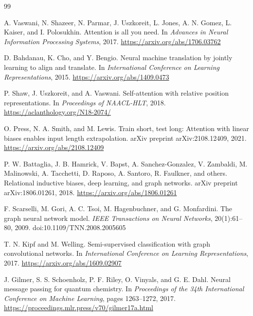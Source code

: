 \documentclass[11pt]{article}
\begin{document}
\begin{thebibliography}{99}

A. Vaswani, N. Shazeer, N. Parmar, J. Uszkoreit, L. Jones, A. N. Gomez, L. Kaiser, and I. Polosukhin.
\newblock Attention is all you need.
\newblock In \emph{Advances in Neural Information Processing Systems}, 2017.
\newblock \url{https://arxiv.org/abs/1706.03762}

D. Bahdanau, K. Cho, and Y. Bengio.
\newblock Neural machine translation by jointly learning to align and translate.
\newblock In \emph{International Conference on Learning Representations}, 2015.
\newblock \url{https://arxiv.org/abs/1409.0473}

P. Shaw, J. Uszkoreit, and A. Vaswani.
\newblock Self-attention with relative position representations.
\newblock In \emph{Proceedings of NAACL-HLT}, 2018.
\newblock \url{https://aclanthology.org/N18-2074/}

O. Press, N. A. Smith, and M. Lewis.
\newblock Train short, test long: Attention with linear biases enables input length extrapolation.
\newblock arXiv preprint arXiv:2108.12409, 2021.
\newblock \url{https://arxiv.org/abs/2108.12409}

P. W. Battaglia, J. B. Hamrick, V. Bapst, A. Sanchez-Gonzalez, V. Zambaldi, M. Malinowski, A. Tacchetti, D. Raposo, A. Santoro, R. Faulkner, and others.
\newblock Relational inductive biases, deep learning, and graph networks.
\newblock arXiv preprint arXiv:1806.01261, 2018.
\newblock \url{https://arxiv.org/abs/1806.01261}

F. Scarselli, M. Gori, A. C. Tsoi, M. Hagenbuchner, and G. Monfardini.
\newblock The graph neural network model.
\newblock \emph{IEEE Transactions on Neural Networks}, 20(1):61--80, 2009.
\newblock doi:10.1109/TNN.2008.2005605

T. N. Kipf and M. Welling.
\newblock Semi-supervised classification with graph convolutional networks.
\newblock In \emph{International Conference on Learning Representations}, 2017.
\newblock \url{https://arxiv.org/abs/1609.02907}

J. Gilmer, S. S. Schoenholz, P. F. Riley, O. Vinyals, and G. E. Dahl.
\newblock Neural message passing for quantum chemistry.
\newblock In \emph{Proceedings of the 34th International Conference on Machine Learning}, pages 1263--1272, 2017.
\newblock \url{https://proceedings.mlr.press/v70/gilmer17a.html}


\end{thebibliography}
\end{document}
